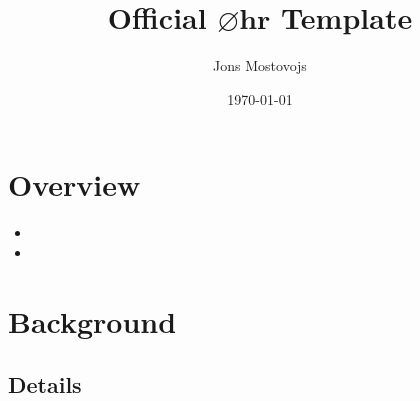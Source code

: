 \documentclass[12pt,a4paper]{article}
\begin{document}
\title{\color{purpleCustom} Official $ \pmb{\varnothing}\textbf{hr} $ Template}
\author{\color{black}Jons Mostovojs}
\date{\color{black}\today}

\maketitle

\section{Overview}

\lipsum[1-2]
\begin{itemize}
    \item \lipsum[][42]
    \item \lipsum[][43]
\end{itemize}

\lipsum[3]

\section{Background}
\lipsum[4-5]

\subsection{Details}
\lipsum[6]
\end{document}
